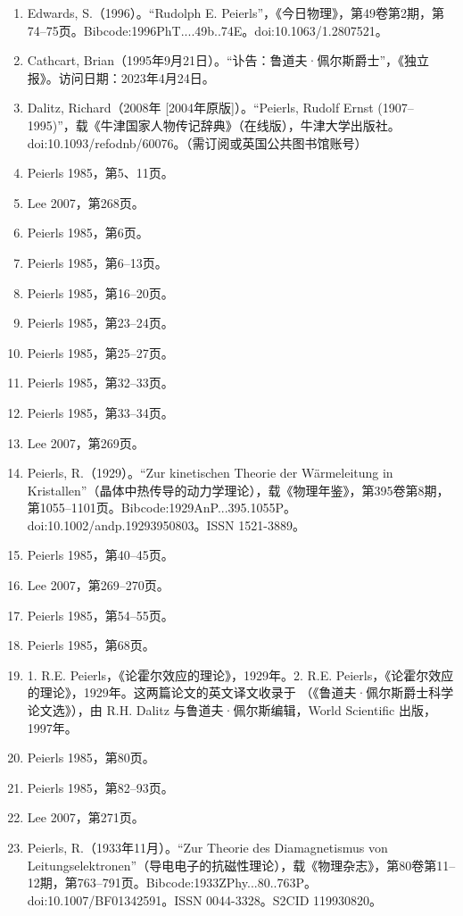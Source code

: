 \begin{enumerate}
\item Edwards, S.（1996）。“Rudolph E. Peierls”，《今日物理》，第49卷第2期，第74–75页。Bibcode:1996PhT....49b..74E。doi:10.1063/1.2807521。
\item Cathcart, Brian（1995年9月21日）。“讣告：鲁道夫·佩尔斯爵士”，《独立报》。访问日期：2023年4月24日。
\item Dalitz, Richard（2008年 [2004年原版]）。“Peierls, Rudolf Ernst (1907–1995)”，载《牛津国家人物传记辞典》（在线版），牛津大学出版社。doi:10.1093/ref\:odnb/60076。（需订阅或英国公共图书馆账号）
\item Peierls 1985，第5、11页。
\item Lee 2007，第268页。
\item Peierls 1985，第6页。
\item Peierls 1985，第6–13页。
\item Peierls 1985，第16–20页。
\item Peierls 1985，第23–24页。
\item Peierls 1985，第25–27页。
\item Peierls 1985，第32–33页。
\item Peierls 1985，第33–34页。
\item Lee 2007，第269页。
\item Peierls, R.（1929）。“Zur kinetischen Theorie der Wärmeleitung in Kristallen”（晶体中热传导的动力学理论），载《物理年鉴》，第395卷第8期，第1055–1101页。Bibcode:1929AnP...395.1055P。doi:10.1002/andp.19293950803。ISSN 1521-3889。
\item Peierls 1985，第40–45页。
\item Lee 2007，第269–270页。
\item Peierls 1985，第54–55页。
\item Peierls 1985，第68页。
\item 1. R.E. Peierls，《论霍尔效应的理论》，1929年。2. R.E. Peierls，《论霍尔效应的理论》，1929年。这两篇论文的英文译文收录于 （《鲁道夫·佩尔斯爵士科学论文选》），由 R.H. Dalitz 与鲁道夫·佩尔斯编辑，World Scientific 出版，1997年。
\item Peierls 1985，第80页。
\item Peierls 1985，第82–93页。
\item Lee 2007，第271页。
\item Peierls, R.（1933年11月）。“Zur Theorie des Diamagnetismus von Leitungselektronen”（导电电子的抗磁性理论），载《物理杂志》，第80卷第11–12期，第763–791页。Bibcode:1933ZPhy...80..763P。doi:10.1007/BF01342591。ISSN 0044-3328。S2CID 119930820。

\end{enumerate}
